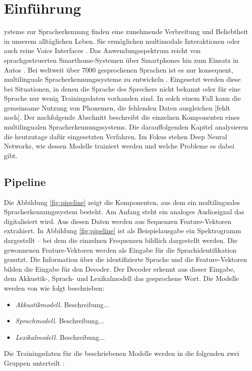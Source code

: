 \section{Einführung}\label{sec:introduction}
ysteme zur Spracherkennung finden eine zunehmende Verbreitung und Beliebtheit in unserem alltäglichen Leben.
Sie ermöglichen multimodale Interaktionen oder auch reine Voice Interfaces \cite{Harris.2004}.
Das Anwendungsspektrum reicht von sprachgesteuerten Smarthome-Systemen über Smartphones hin zum Einsatz in Autos \cite{Yu.2014}.
Bei weltweit über 7000 gesprochenen Sprachen ist es nur konsequent, multilinguale Spracherkennungssysteme zu entwickeln \cite{Gary.2018}.
Eingesetzt werden diese bei Situationen, in denen die Sprache des Sprechers nicht bekannt oder für eine Sprache nur wenig
Trainingsdaten vorhanden sind. In solch einem Fall kann die gemeinsame Nutzung von Phonemen, die fehlenden Daten ausgleichen [fehlt noch].
Der nachfolgende Abschnitt beschreibt die einzelnen Komponenten eines multilingualen Spracherkennungssystems.
Die darauffolgenden Kapitel analysieren die heutzutage dafür eingesetzten Verfahren.
Im Fokus stehen Deep Neural Networks, wie dessen Modelle trainiert werden und welche Probleme es dabei gibt.

\subsection{Pipeline}
Die Abbildung \ref{fig:pipeline} zeigt die Komponenten, aus dem ein multilinguales Spracherkennungssystem besteht.
Am Anfang steht ein analoges Audiosignal das digitalisiert wird. Aus diesen Daten werden aus Sequenzen Feature-Vektoren extrahiert.
In Abbildung \ref{fig:pipeline} ist als Beispielausgabe ein Spektrogramm dargestellt – bei dem die einzelnen Frequenzen bildlich dargestellt werden.
Die gewonnenen Feature-Vektoren werden als Eingabe für die Sprachidentifikation genutzt. Die Information
über die identifizierte Sprache und die Feature-Vektoren bilden die Eingabe für den Decoder. Der Decoder erkennt aus dieser Eingabe,
dem Akkustik-, Sprach- und Lexikalmodell das gesprochene Wort. Die Modelle werden von \cite{Tom.2016} wie folgt beschrieben:
\begin{itemize}
    \item \textit{Akkustikmodell.} Beschreibung...
    \item \textit{Sprachmodell.} Beschreibung...
    \item \textit{Lexikalmodell.} Beschreibung...
\end{itemize}
Die Trainingsdaten für die beschriebenen Modelle werden in die folgenden zwei Gruppen unterteilt \cite{Tom.2016}:

